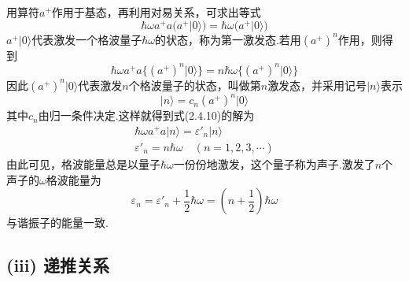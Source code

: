 用算符$a^{+}$作用于基态，再利用对易关系，可求出等式
\begin{equation}
  \hbar\omega a^{+}a\bigl(a^{+}\lvert0\rangle\bigr)
  =\hbar\omega\bigl(a^{+}\lvert0\rangle\bigr)
\end{equation}
$a^{+}\lvert0\rangle$代表激发一个格波量子$\hbar\omega$的状态，称为第一激发态.若用$(a^{+})^n$作用，则得到
\begin{equation*}
  \hbar\omega a^{+}a\bigl\{(a^{+})^n\lvert0\rangle\bigr\}
  =n\hbar\omega\bigl\{(a^{+})^n\lvert0\rangle\bigr\}
\end{equation*}
因此$(a^{+})^n\lvert0\rangle$代表激发$n$个格波量子的状态，叫做第$n$激发态，并采用记号$\lvert n\rangle$表示
\begin{equation}
  \lvert n\rangle=c_n(a^{+})^n\lvert0\rangle
\end{equation}
其中$c_n$由归一条件决定.这样就得到式(2.4.10)的解为
\begin{equation*}
\begin{gathered}
  \hbar\omega a^{+}a\lvert n\rangle=\varepsilon'_n\lvert n\rangle\\[1ex]
  \varepsilon'_n=n\hbar\omega\quad(n=1,2,3,\cdots)
\end{gathered}
\end{equation*}
由此可见，格波能量总是以量子$\hbar\omega$一份份地激发，这个量子称为声子.激发了$n$个声子的$\omega$格波能量为
\begin{equation}
  \varepsilon_n=\varepsilon'_n+\frac{1}{2}\hbar\omega
  =\left(n+\frac{1}{2}\right)\hbar\omega
\end{equation}
与谐振子的能量一致.

\subsection*{(iii) 递推关系}

